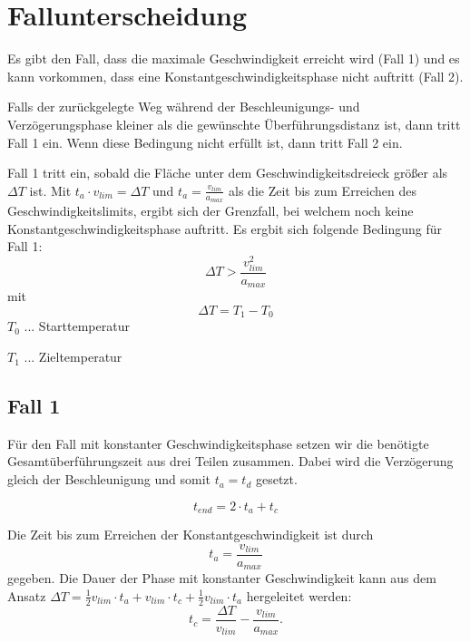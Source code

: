 \documentclass[a4paper, 10pt]{scrartcl}
\begin{document}
	\section{Fallunterscheidung}
		Es gibt den Fall, dass die maximale Geschwindigkeit erreicht wird (Fall 1) und es kann vorkommen, dass eine Konstantgeschwindigkeitsphase nicht auftritt (Fall 2).
		
		Falls der zurückgelegte Weg während der Beschleunigungs- und Verzögerungsphase kleiner als die gewünschte Überführungsdistanz ist, dann tritt Fall 1 ein. Wenn diese Bedingung nicht erfüllt ist, dann tritt Fall 2 ein.
		
		\begin{tcolorbox}[title=Bedingung zur Fallunterscheidung]
			Fall 1 tritt ein, sobald die Fläche unter dem Geschwindigkeitsdreieck größer als $ \Delta T $ ist. Mit $ t_{a} \cdot v_{lim}= \Delta T  $ und $ t_{a} = \frac{v_{lim}}{a_{max}} $ als die Zeit bis zum Erreichen des Geschwindigkeitslimits, ergibt sich der Grenzfall, bei welchem noch keine Konstantgeschwindigkeitsphase auftritt. Es ergbit sich folgende Bedingung für Fall 1:\\
			\begin{equation}
				\Delta T > \frac{v_{lim}^{2}}{a_{max}}
			\end{equation}
			mit
			\[ \Delta T = T_{1} - T_{0} \]
			\tcblower
			$ T_{0} $ ... Starttemperatur
			
			$ T_{1} $ ... Zieltemperatur
			
		\end{tcolorbox}		
	
		\subsection{Fall 1}
			Für den Fall mit konstanter Geschwindigkeitsphase setzen wir die benötigte Gesamtüberführungszeit aus drei Teilen zusammen. Dabei wird die Verzögerung gleich der Beschleunigung und somit $ t_{a}=t_{d} $ gesetzt.
			
			\[t_{end} = 2\cdot t_{a} + t_{c}\]
				
			Die Zeit bis zum Erreichen der Konstantgeschwindigkeit ist durch
			\begin{equation}
				t_{a} = \frac{v_{lim}}{a_{max}}
				\label{ta_case1}
			\end{equation}
			gegeben. Die Dauer der Phase mit konstanter Geschwindigkeit kann aus dem Ansatz $ \Delta T = \frac{1}{2}v_{lim}\cdot t_{a} + v_{lim}\cdot t_{c} + \frac{1}{2}v_{lim}\cdot t_{a} $ hergeleitet werden:
			\begin{equation}
				t_{c} = \frac{\Delta T}{v_{lim}} - \frac{v_{lim}}{a_{max}}.
				\label{tc_case1}
			\end{equation}
			 
\end{document}
